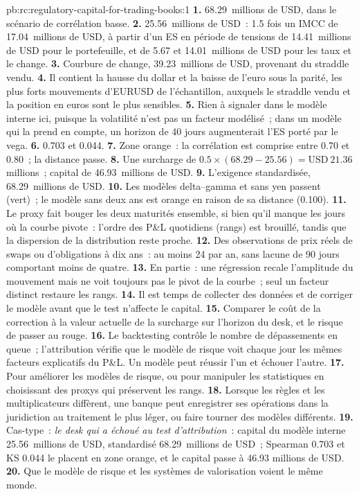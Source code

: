\begin{solution}{pb:rc:regulatory-capital-for-trading-books:1}
\textbf{1.} 68.29~millions de USD, dans le scénario de corrélation basse.
\textbf{2.} 25.56~millions de USD~: 1.5 fois un IMCC de 17.04~millions de USD, à partir d'un ES en période de tensions de 14.41~millions de USD
pour le portefeuille, et de 5.67 et 14.01~millions de USD pour les taux et le change.
\textbf{3.} Courbure de change, 39.23~millions de USD, provenant du straddle vendu.
\textbf{4.} Il contient la hausse du dollar et la baisse de l'euro sous la parité, les plus forts mouvements d'EURUSD
de l'échantillon, auxquels le straddle vendu et la position en euros sont le plus sensibles.
\textbf{5.} Rien à signaler dans le modèle interne ici, puisque la volatilité n'est pas un facteur modélisé~; dans un modèle qui la
prend en compte, un horizon de 40 jours augmenterait l'ES porté par le vega.
\textbf{6.} 0.703 et 0.044.
\textbf{7.} Zone orange~: la corrélation est comprise entre 0.70 et 0.80~; la distance passe.
\textbf{8.} Une surcharge de $0.5\times(68.29-25.56) = \text{USD}~21.36$ millions~; capital de 46.93~millions de USD.
\textbf{9.} L'exigence standardisée, 68.29~millions de USD.
\textbf{10.} Les modèles delta--gamma et sans yen passent (vert)~; le modèle sans deux ans est orange
en raison de sa distance (0.100).
\textbf{11.} Le proxy fait bouger les deux maturités ensemble, si bien qu'il manque les jours où la courbe pivote~: l'ordre des
P\&L quotidiens (rangs) est brouillé, tandis que la dispersion de la distribution reste proche.
\textbf{12.} Des observations de prix réels de swaps ou d'obligations à dix ans~: au moins 24 par an, sans lacune de 90 jours
comportant moins de quatre.
\textbf{13.} En partie~: une régression recale l'amplitude du mouvement mais ne voit toujours pas le pivot de la courbe~; seul un facteur distinct
restaure les rangs.
\textbf{14.} Il est temps de collecter des données et de corriger le modèle avant que le test n'affecte le capital.
\textbf{15.} Comparer le coût de la correction à la valeur actuelle de la surcharge sur l'horizon du desk, et le
risque de passer au rouge.
\textbf{16.} Le backtesting contrôle le nombre de dépassements en queue~; l'attribution vérifie que le modèle de risque voit chaque jour les mêmes facteurs
explicatifs du P\&L. Un modèle peut réussir l'un et échouer l'autre.
\textbf{17.} Pour améliorer les modèles de risque, ou pour manipuler les statistiques en choisissant des proxys qui préservent les rangs.
\textbf{18.} Lorsque les règles et les multiplicateurs diffèrent, une banque peut enregistrer ses opérations dans la juridiction au
traitement le plus léger, ou faire tourner des modèles différents.
\textbf{19.} Cas-type~: \emph{le desk qui a échoué au test d'attribution}~: capital du modèle interne 25.56~millions de USD,
standardisé 68.29~millions de USD~; Spearman 0.703 et KS 0.044 le placent en zone orange, et le capital passe à 46.93
millions de USD.
\textbf{20.} Que le modèle de risque et les systèmes de valorisation voient le même monde.
\end{solution}

